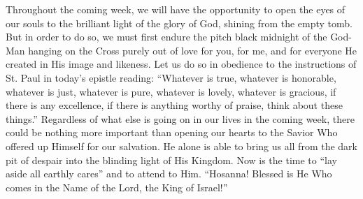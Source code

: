 \documentclass[twoside, letterpaper, 12pt]{report}
\begin{document}
\begin{maybetwocolumns}
Throughout the coming week, we will have the opportunity to open the eyes of our souls to the
brilliant light of the glory of God, shining from the empty tomb. But in order to do so, we must
first endure the pitch black midnight of the God-Man hanging on the Cross purely out of love for
you, for me, and for everyone He created in His image and likeness. Let us do so in obedience to
the instructions of St. Paul in today’s epistle reading: “Whatever is true, whatever is honorable,
whatever is just, whatever is pure, whatever is lovely, whatever is gracious, if there is any
excellence, if there is anything worthy of praise, think about these things.” Regardless of what
else is going on in our lives in the coming week, there could be nothing more important than
opening our hearts to the Savior Who offered up Himself for our salvation. He alone is able to
bring us all from the dark pit of despair into the blinding light of His Kingdom. Now is the time
to “lay aside all earthly cares” and to attend to Him. “Hosanna! Blessed is He Who comes in the
Name of the Lord, the King of Israel!”

\end{maybetwocolumns}



\vspace{1cm}

\readerline{\throughtheprayers}

\end{document}
